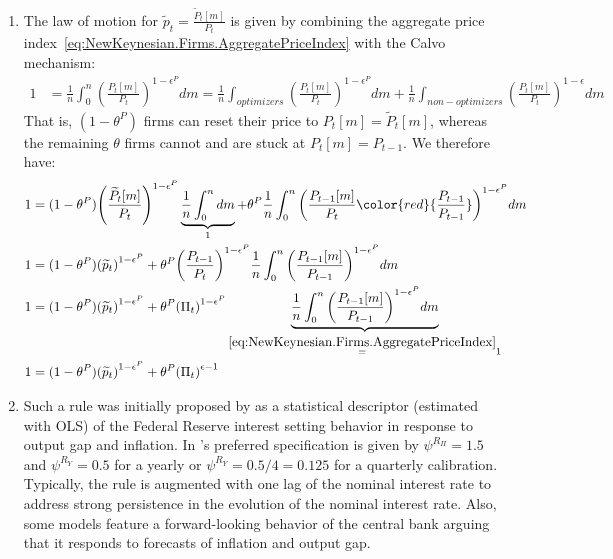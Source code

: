 \begin{enumerate}
\item
The law of motion for \(\widetilde{p}_{t}=\frac{\widetilde{P}_{t}[m]}{P_{t}}\) is given
  by combining the aggregate price index~\eqref{eq:NewKeynesian.Firms.AggregatePriceIndex} with the Calvo mechanism:
\begin{align*}
1 &= \frac{1}{n} \int_{0}^{n} {\left(\frac{P_{t}[m]}{P_{t}}\right)}^{1-\epsilon^{P}} dm
= \frac{1}{n} \int_{optimizers} {\left(\frac{P_{t}[m]}{P_{t}}\right)}^{1-\epsilon^{P}} dm
+ \frac{1}{n} \int_{non-optimizers} {\left(\frac{P_{t}[m]}{P_{t}}\right)}^{1-\epsilon} dm
\end{align*}
That is, \((1-\theta^{P})\) firms can reset their price to \(P_{t}[m] = \widetilde{P}_{t}[m]\),
  whereas the remaining \(\theta \) firms cannot and are stuck at \(P_{t}[m]=P_{t-1}\).
We therefore have:
\begin{align*}
1 &= (1-\theta^{P}) {\left(\frac{\widetilde{P}_t[m]}{P_t}\right)}^{1-\epsilon^{P}} \underbrace{\frac{1}{n} \int_{0}^{n} dm}_{1}
  + \theta^{P} \frac{1}{n} \int_{0}^{n} {\left(\frac{P_{t-1}[m]}{P_{t}}{\color{red}{\frac{P_{t-1}}{P_{t-1}}}}\right)}^{1-\epsilon^{P}} dm
\\
1 &= (1-\theta^{P}) {(\widetilde{p}_{t})}^{1-\epsilon^{P}}
  + \theta^{P} {\left(\frac{P_{t-1}}{P_{t}}\right)}^{1-\epsilon^{P}} \frac{1}{n} \int_{0}^{n} {\left(\frac{P_{t-1}[m]}{P_{t-1}}\right)}^{1-\epsilon^{P}} dm
\\
1 &= (1-\theta^{P}) {(\widetilde{p}_{t})}^{1-\epsilon^{P}}
  + \theta^{P} {(\Pi_{t})}^{1-\epsilon^{P}} \underbrace{\frac{1}{n} \int_{0}^{n} {\left(\frac{P_{t-1}[m]}{P_{t-1}} \right)}^{1-\epsilon^{P}} dm}_{\overset{\eqref{eq:NewKeynesian.Firms.AggregatePriceIndex}}{=}1}
\\
1 &= (1-\theta^{P}) {(\widetilde{p}_{t})}^{1-\epsilon^{P}} + \theta^{P} {(\Pi_{t})}^{\epsilon-1}
\end{align*}

\item
Such a rule was initially proposed by \textcite{Taylor_1993_DiscretionPolicyRules}
  as a statistical descriptor (estimated with OLS) of the Federal Reserve interest setting behavior in response to output gap and inflation.
In \textcite{Taylor_1993_DiscretionPolicyRules}'s preferred specification is given by
  \(\psi^{R_\Pi}=1.5\) and \(\psi^{R_Y}=0.5\) for a yearly or \(\psi^{R_Y}=0.5/4=0.125\) for a quarterly calibration.
Typically, the rule is augmented with one lag of the nominal interest rate to address strong persistence in the evolution of the nominal interest rate.
Also, some models feature a forward-looking behavior of the central bank arguing that it responds to forecasts of inflation and output gap.


\end{enumerate}
